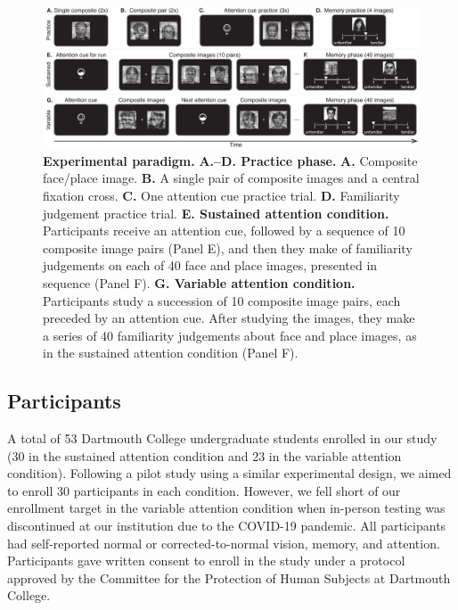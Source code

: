 \documentclass[english]{article}
\begin{document}
\begin{figure}[tp]
  \centering
  \includegraphics[width=1\textwidth]{figs/paradigm}

  \caption{\textbf{Experimental paradigm.} \textbf{A.--D. Practice phase.}
  \textbf{A.} Composite face/place image. \textbf{B.} A single pair of
  composite images and a central fixation cross. \textbf{C.} One attention cue
  practice trial. \textbf{D.} Familiarity judgement practice trial. \textbf{E.
  Sustained attention condition.} Participants receive an attention cue,
  followed by a sequence of 10 composite image pairs (Panel E), and then they
  make of familiarity judgements on each of 40 face and place images, presented
  in sequence (Panel F).  \textbf{G.  Variable attention condition.}  Participants
  study a succession of 10 composite image pairs, each preceded by an attention cue.
  After studying the images, they make a series of 40 familiarity judgements about
  face and place images, as in the sustained attention condition (Panel F).}

\label{fig:paradigm}
\end{figure}

\subsection*{Participants} 

A total of 53 Dartmouth College undergraduate students enrolled in our study
(30 in the sustained attention condition and 23 in the variable attention
condition). Following a pilot study using a similar experimental design, we
aimed to enroll 30 participants in each condition. However, we fell short of
our enrollment target in the variable attention condition when in-person
testing was discontinued at our institution due to the COVID-19 pandemic. All
participants had self-reported normal or corrected-to-normal vision, memory,
and attention. Participants gave written consent to enroll in the study under a
protocol approved by the Committee for the Protection of Human Subjects at
Dartmouth College.
\end{document}
